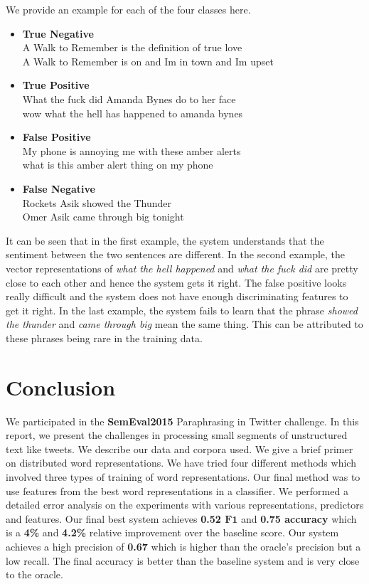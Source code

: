 \documentclass[conference]{IEEEtran}
\begin{document}
\indent We provide an example for each of the four classes here.\\
\begin{itemize}
\item
\textbf{True Negative}\\
A Walk to Remember is the definition of true love\\
A Walk to Remember is on and Im in town and Im upset\\
\item
\textbf{True Positive}\\
What the fuck did Amanda Bynes do to her face\\
wow what the hell has happened to amanda bynes\\
\item
\textbf{False Positive}\\
My phone is annoying me with these amber alerts\\
what is this amber alert thing on my phone\\
\item
\textbf{False Negative}\\
Rockets Asik showed the Thunder\\
Omer Asik came through big tonight\\
\end{itemize}
It can be seen that in the first example, the system understands that the sentiment between the two sentences are different. In the second example, the vector representations of \emph{what the hell happened} and \emph{what the fuck did} are pretty close to each other and hence the system gets it right. The false positive looks really difficult and the system does not have enough discriminating features to get it right. In the last example, the system fails to learn that the phrase \emph{showed the thunder} and \emph{came through big} mean the same thing. This can be attributed to these phrases being rare in the training data.\\

\section{Conclusion}
We participated in the \textbf{SemEval2015} Paraphrasing in Twitter challenge. In this report, we present the challenges in processing small segments of unstructured text like tweets. We describe our data and corpora used. We give a brief primer on distributed word representations. We have tried four different methods which involved three types of training of word representations. Our final method was to use features from the best word representations in a classifier. We performed a detailed error analysis on the experiments with various representations, predictors and features. Our final best system achieves \textbf{0.52 $\textbf{F1}$} and \textbf{0.75 accuracy} which is a \textbf{4\%} and  \textbf{4.2\%} relative improvement over the baseline score. Our system achieves a high precision of \textbf{0.67} which is higher than the oracle's precision but a low recall. The final accuracy is better than the baseline system and is very close to the oracle.\\
\end{document}

